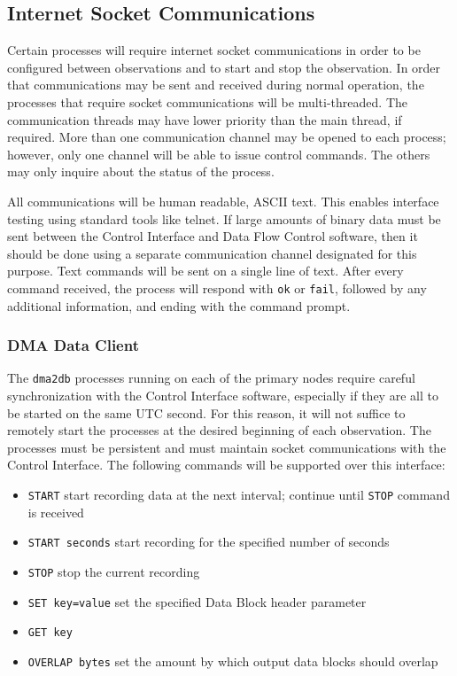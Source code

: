 \subsection{Internet Socket Communications}

Certain processes will require internet socket communications in order
to be configured between observations and to start and stop the
observation.  In order that communications may be sent and received
during normal operation, the processes that require socket
communications will be multi-threaded.  The communication threads may
have lower priority than the main thread, if required.  More than one
communication channel may be opened to each process; however, only one
channel will be able to issue control commands.  The others may only
inquire about the status of the process.

All communications will be human readable, ASCII text.  This enables
interface testing using standard tools like telnet.  If large amounts
of binary data must be sent between the Control Interface and Data
Flow Control software, then it should be done using a separate
communication channel designated for this purpose.  Text commands will
be sent on a single line of text.  After every command received, the
process will respond with {\tt ok} or {\tt fail}, followed by any
additional information, and ending with the command prompt.

\subsubsection{DMA Data Client}

The {\tt dma2db} processes running on each of the primary nodes
require careful synchronization with the Control Interface software,
especially if they are all to be started on the same UTC second.  For
this reason, it will not suffice to remotely start the processes at
the desired beginning of each observation.  The processes must be
persistent and must maintain socket communications with the Control
Interface.  The following commands will be supported over this
interface:

\begin{itemize}
\item {\tt START} start recording data at the next interval; continue
  until {\tt STOP} command is received
\item {\tt START seconds} start recording for the specified number of
  seconds
\item {\tt STOP} stop the current recording
\item {\tt SET key=value} set the specified Data Block header parameter
\item {\tt GET key}
\item {\tt OVERLAP bytes} set the amount by which output data blocks
  should overlap
\end{itemize}

